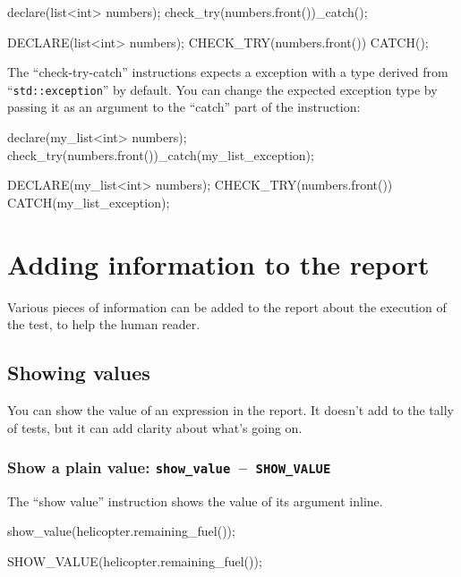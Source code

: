 \documentclass[twoside, a4paper, article]{memoir}
\newcommand*\testudocolor{\color{red!80!blue}}
\newcommand*\testudo[1]{\texttt{\testudocolor{}#1}}
\newcommand*\testudopair[2]{\testudo{#1}~--~\testudo{#2}}
\newcommand\subsubsectiontestudopair[3]{%
  \subsubsection[#1]{#1: \testudopair{#2}{#3}}}
\begin{document}
\begin{cpplisting}
declare(list<int> numbers);
check_try(numbers.front())_catch();
\end{cpplisting}

\begin{cpplisting}
DECLARE(list<int> numbers);
CHECK_TRY(numbers.front()) CATCH();
\end{cpplisting}

The ``check-try-catch'' instructions expects a exception with a type derived
from ``\texttt{std::exception}'' by default.  You can change the expected
exception type by passing it as an argument to the ``catch'' part of the
instruction:
\begin{cpplisting}
declare(my_list<int> numbers);
check_try(numbers.front())_catch(my_list_exception);
\end{cpplisting}

\begin{cpplisting}
DECLARE(my_list<int> numbers);
CHECK_TRY(numbers.front()) CATCH(my_list_exception);
\end{cpplisting}


\section{Adding information to the report}
\label{sec:adding-information-report}

Various pieces of information can be added to the report about the execution of
the test, to help the human reader.

\subsection{Showing values}
\label{sec:showing-values}

You can show the value of an expression in the report.  It doesn't add to the
tally of tests, but it can add clarity about what's going on.

\subsubsectiontestudopair{Show a plain value}%
  {show\_value}{SHOW\_VALUE}
\label{sec:show-plain-value}

The ``show value'' instruction shows the value of its argument inline.

\begin{cpplisting}
show_value(helicopter.remaining_fuel());
\end{cpplisting}

\begin{cpplisting}
SHOW_VALUE(helicopter.remaining_fuel());
\end{cpplisting}
\end{document}
